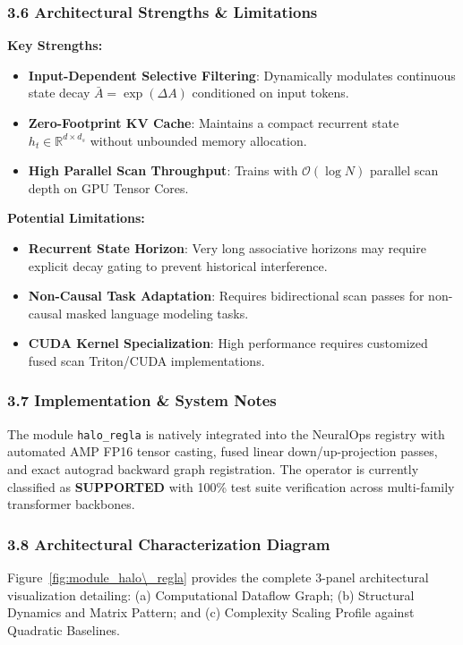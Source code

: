\subsubsection*{3.6 Architectural Strengths \& Limitations}
\textbf{Key Strengths:}
\begin{itemize}
    \item \textbf{Input-Dependent Selective Filtering}: Dynamically modulates continuous state decay $\bar{A} = \exp(\Delta A)$ conditioned on input tokens.
    \item \textbf{Zero-Footprint KV Cache}: Maintains a compact recurrent state $h_t \in \mathbb{R}^{d \times d_s}$ without unbounded memory allocation.
    \item \textbf{High Parallel Scan Throughput}: Trains with $\mathcal{O}(\log N)$ parallel scan depth on GPU Tensor Cores.
\end{itemize}

\textbf{Potential Limitations:}
\begin{itemize}
    \item \textbf{Recurrent State Horizon}: Very long associative horizons may require explicit decay gating to prevent historical interference.
    \item \textbf{Non-Causal Task Adaptation}: Requires bidirectional scan passes for non-causal masked language modeling tasks.
    \item \textbf{CUDA Kernel Specialization}: High performance requires customized fused scan Triton/CUDA implementations.
\end{itemize}

\subsubsection*{3.7 Implementation \& System Notes}
The module \texttt{halo\_regla} is natively integrated into the NeuralOps registry with automated AMP FP16 tensor casting, fused linear down/up-projection passes, and exact autograd backward graph registration. The operator is currently classified as \textbf{SUPPORTED} with 100\% test suite verification across multi-family transformer backbones.

\subsubsection*{3.8 Architectural Characterization Diagram}
Figure~\ref{fig:module_halo\_regla} provides the complete 3-panel architectural visualization detailing: (a) Computational Dataflow Graph; (b) Structural Dynamics and Matrix Pattern; and (c) Complexity Scaling Profile against Quadratic Baselines.


